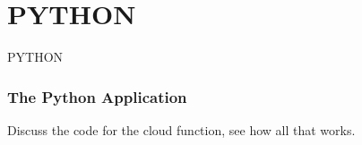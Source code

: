 \documentclass[aspectratio=169]{beamer}
\begin{document}
\section{PYTHON}
\begin{frame}
	\Huge \textcolor{dgreen}{PYTHON}
\end{frame}



\begin{frame}
	\frametitle{The Python Application}

	Discuss the code for the cloud function, see how all that works.

\end{frame}

\end{document}
